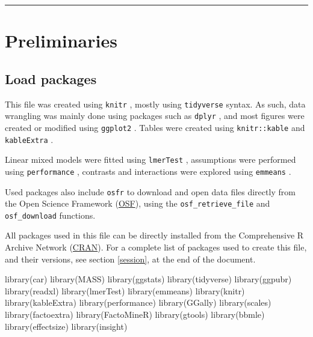 \documentclass[
  bookmarksnumbered]{article}
\newenvironment{Shaded}{\begin{snugshade}}{\end{snugshade}}
\newcommand{\FunctionTok}[1]{\textcolor[rgb]{0.94,0.94,0.56}{#1}}
\newcommand{\NormalTok}[1]{\textcolor[rgb]{0.80,0.80,0.80}{#1}}
\begin{document}
\begin{center}\rule{0.5\linewidth}{0.5pt}\end{center}

\section{Preliminaries}\label{preliminaries}

\subsection{Load packages}\label{load-packages}

This file was created using \texttt{knitr} \autocite{knitrcit}, mostly using \texttt{tidyverse} \autocite{tidyversecit} syntax. As such, data wrangling was mainly done using packages such as \texttt{dplyr} \autocite{dplyrcit}, and most figures were created or modified using \texttt{ggplot2} \autocite{ggplotcit}. Tables were created using \texttt{knitr::kable} and \texttt{kableExtra} \autocite{kableExtracit}.

Linear mixed models were fitted using \texttt{lmerTest} \autocite{lmertestcit}, assumptions were performed using \texttt{performance} \autocite{ludecke2021}, contrasts and interactions were explored using \texttt{emmeans} \autocite{emmeanscit}.

Used packages also include \texttt{osfr} \autocite{osfrcit} to download and open data files directly from the Open Science Framework (\href{https://osf.io/}{OSF}), using the \texttt{osf\_retrieve\_file} and \texttt{osf\_download} functions.

All packages used in this file can be directly installed from the Comprehensive R Archive Network (\href{https://cran.r-project.org/}{CRAN}). For a complete list of packages used to create this file, and their versions, see section \ref{session}, at the end of the document.

\begin{Shaded}
\begin{Highlighting}[]
\FunctionTok{library}\NormalTok{(car)}
\FunctionTok{library}\NormalTok{(MASS)}
\FunctionTok{library}\NormalTok{(ggstats)}
\FunctionTok{library}\NormalTok{(tidyverse)}
\FunctionTok{library}\NormalTok{(ggpubr)}
\FunctionTok{library}\NormalTok{(readxl)}
\FunctionTok{library}\NormalTok{(lmerTest)}
\FunctionTok{library}\NormalTok{(emmeans)}
\FunctionTok{library}\NormalTok{(knitr)}
\FunctionTok{library}\NormalTok{(kableExtra)}
\FunctionTok{library}\NormalTok{(performance)}
\FunctionTok{library}\NormalTok{(GGally)}
\FunctionTok{library}\NormalTok{(scales)}
\FunctionTok{library}\NormalTok{(factoextra)}
\FunctionTok{library}\NormalTok{(FactoMineR)}
\FunctionTok{library}\NormalTok{(gtools)}
\FunctionTok{library}\NormalTok{(bbmle)}
\FunctionTok{library}\NormalTok{(effectsize)}
\FunctionTok{library}\NormalTok{(insight)}
\end{Highlighting}
\end{Shaded}
\end{document}
